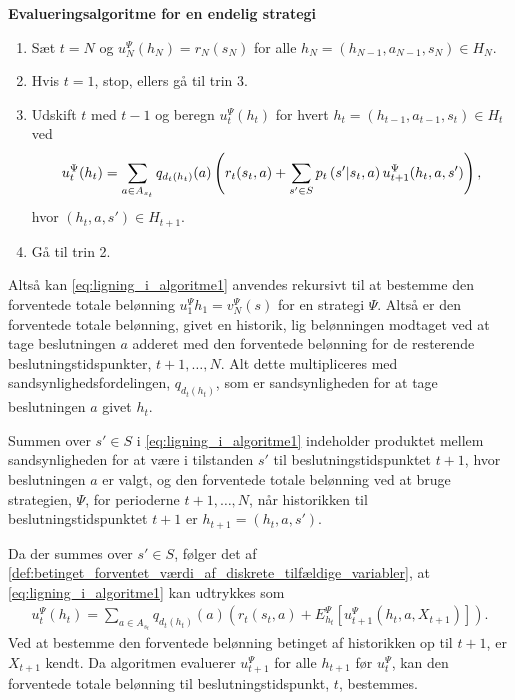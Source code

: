 \begin{alg} \textbf{Evalueringsalgoritme for en endelig strategi} \label{Algoritme1}%
\begin{enumerate}
    \item Sæt $t = N $ og $u_N^\Psi(h_N) = r_N(s_N)$ for alle $h_N = (h_{N-1}, a_{N-1}, s_N) \in H_N$.
    \item Hvis $t = 1$, stop, ellers gå til trin 3.
    \item Udskift $t$ med $t-1$ og beregn $u_t^\Psi(h_t)$ for hvert $h_t = (h_{t-1}, a_{t-1}, s_t)\in H_t$ ved \begin{align}\label{eq:ligning_i_algoritme1}
        \vspace{-0.5cm}u_t^\Psi(h_t) = \sum_{a \in A_{s_t}}q_{d_t(h_t)}(a)\left(r_t(s_t, a) + \sum_{s' \in S} p_t\left(s'|s_t,a\right)u_{t+1}^\Psi(h_t,a,s')\right),
    \end{align}
    hvor $(h_t, a ,s') \in H_{t+1}$.
    \item Gå til trin 2.
\end{enumerate}
\end{alg}
Altså kan \eqref{eq:ligning_i_algoritme1} anvendes rekursivt til at bestemme den forventede totale belønning $u_1^\Psi{h_1} = v_N^\Psi(s)$ for en strategi $\Psi$. Altså er den forventede totale belønning, givet en historik, lig belønningen modtaget ved at tage beslutningen $a$ adderet med den forventede belønning for de resterende beslutningstidspunkter, $t+1, \ldots, N$. Alt dette multipliceres med sandsynlighedsfordelingen, $q_{d_t(h_t)}$, som er sandsynligheden for at tage beslutningen $a$ givet $h_t$.

Summen over $s' \in S$ i \eqref{eq:ligning_i_algoritme1} indeholder produktet mellem sandsynligheden for at være i tilstanden $s'$ til beslutningstidspunktet $t+1$, hvor beslutningen $a$ er valgt, og den forventede totale belønning ved at bruge strategien, $\Psi$, for perioderne $t+1, \ldots, N$, når historikken til beslutningstidspunktet $t+1$ er $h_{t+1} = (h_t, a, s')$. 

Da der summes over $s' \in S$, følger det af \autoref{def:betinget_forventet_værdi_af_diskrete_tilfældige_variabler}, at \eqref{eq:ligning_i_algoritme1} kan udtrykkes som 
\begin{align}\label{eq:algoritme_ligning_vol2}
    u_t^\Psi(h_t)=\sum_{a \in A_{s_t}}q_{d_t(h_t)}(a)\left(r_t\left(s_t,a\right)+E_{h_t}^\Psi\left[u_{t+1}^\Psi\left(h_t, a, X_{t+1}\right)\right]\right).
\end{align}
Ved at bestemme den forventede belønning betinget af historikken op til $t+1$, er $X_{t+1}$ kendt. Da algoritmen evaluerer $u^\Psi_{t+1}$ for alle $h_{t+1}$ før $u^\Psi_t$, kan den forventede totale belønning til beslutningstidspunkt, $t$, bestemmes.

